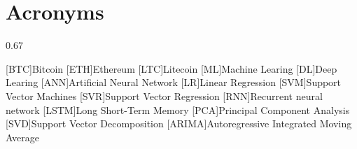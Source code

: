 \chapter*{Acronyms}

\begin{acronym}[ARIMA]
{\setlength{\baselineskip}%
{0.67\baselineskip}

[BTC]{Bitcoin}
[ETH]{Ethereum}
[LTC]{Litecoin}
[ML]{Machine Learing}
[DL]{Deep Learing}
[ANN]{Artificial Neural Network}
[LR]{Linear Regression}
[SVM]{Support Vector Machines}
[SVR]{Support Vector Regression}
[RNN]{Recurrent neural network}
[LSTM]{Long Short-Term Memory}
[PCA]{Principal Component Analysis}
[SVD]{Support Vector Decomposition}
[ARIMA]{Autoregressive Integrated Moving Average}



\par}
\end{acronym}